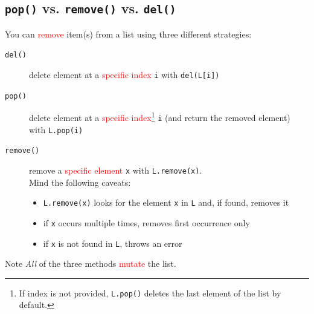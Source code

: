 \documentclass[t,handout,9pt]{beamer}
\begin{document}
\subsection{\texttt{pop()} vs. \texttt{remove()} vs. \texttt{del()}}
\begin{frame}
\vfill
You can \textcolor{red}{remove} item(s) from a list using three different strategies:
\begin{description}
	\item[\texttt{del()}] delete element at a \textcolor{red}{specific index} \texttt{i} with \texttt{del(L[i])}
	\item[\texttt{pop()}] delete element at a \textcolor{red}{specific index}\footnote{If index is not provided, \texttt{L.pop()} deletes the last element of the list by default.} \texttt{i} (and return the removed element) with \texttt{L.pop(i)}
	\item[\texttt{remove()}] remove a \textcolor{red}{specific element} \texttt{x} with \texttt{L.remove(x)}.\\
	Mind the following caveats:
	\begin{itemize}
		\item \texttt{L.remove(x)} looks for the element \texttt{x} in \texttt{L} and, if found, removes it
		\item if \texttt{x} occurs multiple times, removes first occurrence only
		\item if \texttt{x} is not found in \texttt{L}, throws an error
	\end{itemize}
\end{description}
\vfill
\begin{block}{Note}
\textit{All} of the three methods \textcolor{red}{mutate} the list.
\end{block}
\vfill
\end{frame}
%
\end{document}
